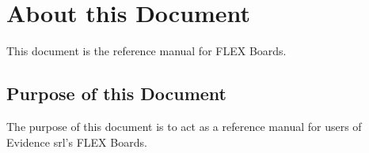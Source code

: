 \chapter{About this Document}
\label{ch:about_doc}
This document is the reference manual for FLEX Boards.\\



\section{Purpose of this Document}
\label{sec:func_doc}
The purpose of this document is to act as a reference manual for users of Evidence srl's FLEX Boards.\\


\pagebreak
